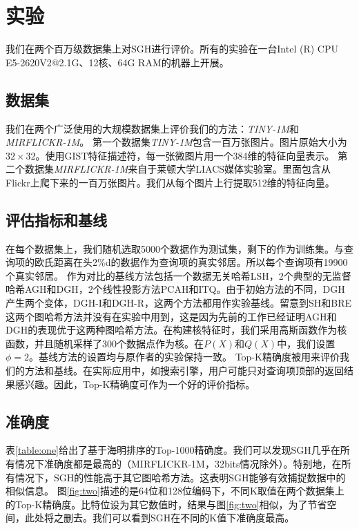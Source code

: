 \documentclass{article}
\begin{document}
\section{实验}
我们在两个百万级数据集上对SGH进行评价。所有的实验在一台Intel (R) CPU E5-2620V2@2.1G、12核、64G RAM的机器上开展。


\subsection{数据集}
我们在两个广泛使用的大规模数据集上评价我们的方法：\emph{TINY-1M}\cite{NIPS2014_5332}和\emph{MIRFLICKR-1M}\cite{Huiskes2010New}。
第一个数据集\emph{TINY-1M}包含一百万张图片。图片原始大小为$32\times 32$。使用GIST特征描述符，每一张微图片用一个384维的特征向量表示。
第二个数据集\emph{MIRFLICKR-1M}来自于莱顿大学LIACS媒体实验室。里面包含从Flickr上爬下来的一百万张图片。我们从每个图片上行提取512维的特征向量。


\subsection{评估指标和基线}
在每个数据集上，我们随机选取5000个数据作为测试集，剩下的作为训练集。与查询项的欧氏距离在头2\%d的数据作为查询项的真实邻居。所以每个查询项有19900个真实邻居。
作为对比的基线方法包括一个数据无关哈希LSH\cite{Datar:2004:LHS:997817.997857}，2个典型的无监督哈希AGH\cite{Liu2011Hashing}和DGH\cite{NIPS2014_5332}，2个线性投影方法PCAH\cite{PMID:24136430}和ITQ\cite{PMID:24136430}。由于初始方法的不同，DGH产生两个变体\cite{NIPS2014_5332}，DGH-I和DGH-R，这两个方法都用作实验基线。留意到SH和BRE这两个图哈希方法并没有在实验中用到，这是因为先前的工作已经证明AGH和DGH的表现优于这两种图哈希方法\cite{NIPS2014_5332}。在构建核特征时，我们采用高斯函数作为核函数，并且随机采样了300个数据点作为核。在$P(X)$和$Q(X)$中，我们设置$\phi =2$。基线方法的设置均与原作者的实验保持一致。
Top-K精确度\cite{NIPS2014_5332}被用来评价我们的方法和基线。在实际应用中，如搜索引擎，用户可能只对查询项顶部的返回结果感兴趣。因此，Top-K精确度可作为一个好的评价指标。



\subsection{准确度}
表\ref{table:one}给出了基于海明排序的Top-1000精确度。我们可以发现SGH几乎在所有情况下准确度都是最高的（MIRFLICKR-1M，32bits情况除外）。特别地，在所有情况下，SGH的性能高于其它图哈希方法。这表明SGH能够有效捕捉数据中的相似信息。
图\ref{fig:two}描述的是64位和128位编码下，不同K取值在两个数据集上的Top-K精确度。比特位设为其它数值时，结果与图\ref{fig:two}相似，为了节省空间，此处将之删去。我们可以看到SGH在不同的K值下准确度最高。
\end{document}
